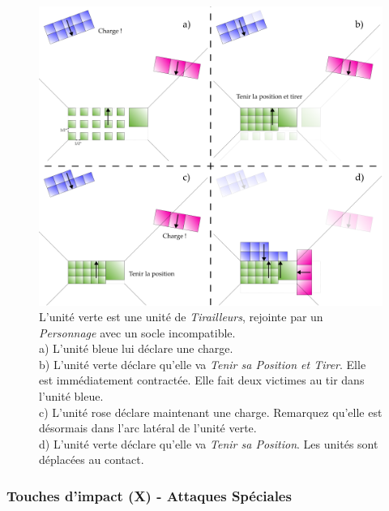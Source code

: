 \begin{figure}[!htbp]
\centering
\includegraphics[width=15.5cm]{tirailleurs.png}
\caption{L'unité verte est une unité de \emph{Tirailleurs}, rejointe par un \emph{Personnage} avec un socle incompatible. \\
a) L'unité bleue lui déclare une charge. \\
b) L'unité verte déclare qu'elle va \emph{Tenir sa Position et Tirer}. Elle est immédiatement contractée. Elle fait deux victimes au tir dans l'unité bleue. \\
c) L'unité rose déclare maintenant une charge. Remarquez qu'elle est désormais dans l'arc latéral de l'unité verte. \\
d) L'unité verte déclare qu'elle va \emph{Tenir sa Position}. Les unités sont déplacées au contact.}
\label{figure/tirailleurs}
\end{figure}

\subsubsection*{Touches d'impact (X) - Attaques Spéciales}

